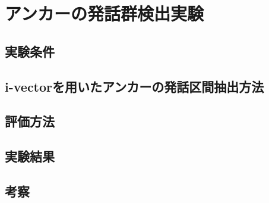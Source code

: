 \section{アンカーの発話群検出実験}
\subsection{実験条件}
\subsection{i-vectorを用いたアンカーの発話区間抽出方法}

\subsection{評価方法}
\subsection{実験結果}
\subsection{考察}
